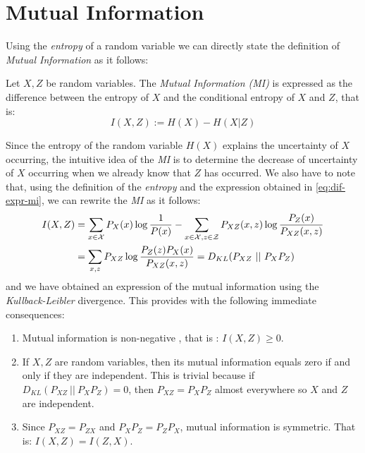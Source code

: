 \section{Mutual Information}

Using the \emph{entropy} of a random variable we can directly state the definition of \emph{Mutual Information} as it follows:

\begin{ndef}
Let $X,Z$ be random variables. The \emph{Mutual Information (MI)} is expressed as the difference between the entropy of $X$ and the conditional entropy of $X$ and $Z$, that is:
$$
I(X,Z) := H(X) - H(X|Z)
$$
\end{ndef}

Since the entropy of the random variable $H(X)$ explains the uncertainty of $X$ occurring, the intuitive idea of the \emph{MI} is to determine the decrease of uncertainty of $X$ occurring when we already
know that $Z$ has occurred. We also have to note that, using the definition of the \emph{entropy} and the expression obtained in \ref{eq:dif-expr-mi}, we can rewrite the \emph{MI} as it follows:
\begin{align*}
I(X,Z) & = \sum_{x \in \mathcal{X}}P_X(x) \log \frac{1}{P(x)} - \sum_{x \in \mathcal{X}, z \in \mathcal Z} P_{XZ}(x,z) \log \frac{P_Z(x)}{P_{XZ}(x,z)} \\  & = \sum_{x,z}P_{XZ}\log \frac{P_Z(z)P_X(x)}{P_{XZ}(x,z)} = D_{KL}(P_{XZ} \ || \ P_X P_Z)
\end{align*}
and we have obtained an expression of the mutual information using the \emph{Kullback-Leibler} divergence. This provides with the following immediate consequences:
\begin{enumerate}[label=$(\roman*)$]
\item Mutual information is non-negative , that is : $I(X,Z) \geq 0$.
\item If $X,Z$ are random variables, then its mutual information equals zero if and only if they are independent. This is trivial because if $D_{KL}(P_{XZ} \ || \ P_X P_Z) = 0$, then $P_{XZ} = P_X P_Z$ almost everywhere so $X$ and $Z$ are independent.
\item Since $P_{XZ} = P_{ZX}$ and $P_X P_Z = P_Z P_X$, mutual information is symmetric. That is: $I(X,Z) = I(Z,X)$.
\end{enumerate}